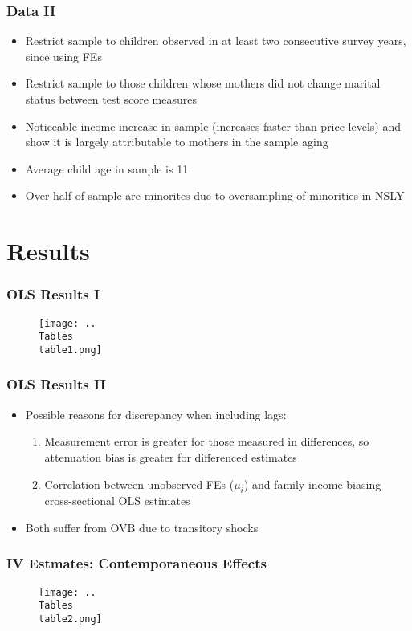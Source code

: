 \documentclass{beamer}
\begin{document}
\begin{frame}
\frametitle{Data II}
\begin{itemize}
	\item Restrict sample to children observed in at least two consecutive survey years, since using FEs
	\item Restrict sample to those children whose mothers did not change marital status between test score measures
	\item Noticeable income increase in sample (increases faster than price levels) and show it is largely attributable to mothers in the sample aging
	\item Average child age in sample is 11
	\item Over half of sample are minorites due to oversampling of minorities in NSLY
\end{itemize}
\end{frame}


\section{Results}


\begin{frame}
\frametitle{OLS Results I}
	\begin{figure}
		\texttt{[image: ..\\Tables\\table1.png]} %
	\end{figure}
\end{frame}

\begin{frame}
\frametitle{OLS Results II}
	\begin{itemize}
		\item Possible reasons for discrepancy when including lags:
		\begin{enumerate}[(1)]
			\item Measurement error is greater for those measured in differences, so attenuation bias is greater for differenced estimates
			\item Correlation between unobserved FEs ($\mu_i$) and family income biasing cross-sectional OLS estimates 
		\end{enumerate}
		\item Both suffer from OVB due to transitory shocks
	\end{itemize}
\end{frame}

\begin{frame}
\frametitle{IV Estmates: Contemporaneous Effects}
	\begin{figure}
		\texttt{[image: ..\\Tables\\table2.png]}
	\end{figure}
\end{frame}
\end{document}
